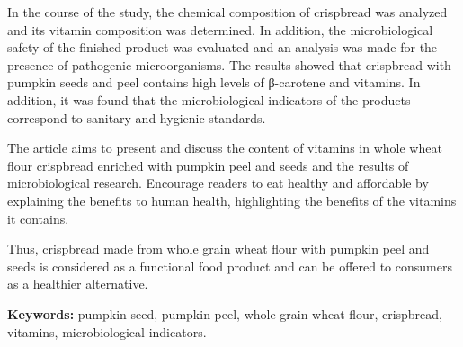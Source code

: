 In the course of the study, the chemical composition of crispbread was
analyzed and its vitamin composition was determined. In addition, the
microbiological safety of the finished product was evaluated and an
analysis was made for the presence of pathogenic microorganisms. The
results showed that crispbread with pumpkin seeds and peel contains high
levels of β-carotene and vitamins. In addition, it was found that the
microbiological indicators of the products correspond to sanitary and
hygienic standards.

The article aims to present and discuss the content of vitamins in whole
wheat flour crispbread enriched with pumpkin peel and seeds and the
results of microbiological research. Encourage readers to eat healthy
and affordable by explaining the benefits to human health, highlighting
the benefits of the vitamins it contains.

Thus, crispbread made from whole grain wheat flour with pumpkin peel and
seeds is considered as a functional food product and can be offered to
consumers as a healthier alternative.

{\bfseries Keywords:} pumpkin seed, pumpkin peel, whole grain wheat flour,
crispbread, vitamins, microbiological indicators.

